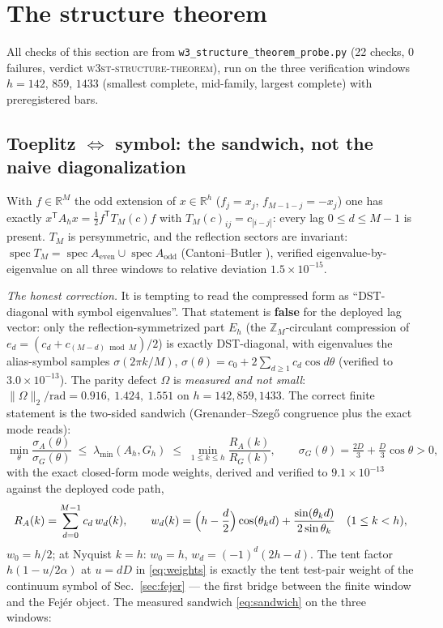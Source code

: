 \documentclass[11pt,a4paper]{article}
\theoremstyle{remark}
\DeclareMathOperator{\spec}{spec}
\begin{document}
\section{The structure theorem}\label{sec:structure}

All checks of this section are from
\texttt{w3\_structure\_theorem\_probe.py} (22 checks, 0 failures,
verdict \textsc{w3st-structure-theorem}), run on the three verification
windows $h=142$, $859$, $1433$ (smallest complete, mid-family, largest
complete) with preregistered bars.

\subsection{Toeplitz $\Leftrightarrow$ symbol: the sandwich, not the
naive diagonalization}

With $f\in\mathbb R^M$ the odd extension of $x\in\mathbb R^h$
($f_j=x_j$, $f_{M-1-j}=-x_j$) one has exactly
$x^{\mathsf T}A_hx=\tfrac12 f^{\mathsf T}T_M(c)f$ with
$T_M(c)_{ij}=c_{|i-j|}$: every lag $0\le d\le M-1$ is present.  $T_M$
is persymmetric, and the reflection sectors are invariant:
$\spec T_M=\spec A_{\mathrm{even}}\cup\spec A_{\mathrm{odd}}$
(Cantoni--Butler \cite{CB76}), verified eigenvalue-by-eigenvalue on all
three windows to relative deviation $1.5\times10^{-15}$.

\emph{The honest correction.}  It is tempting to read the compressed
form as ``DST-diagonal with symbol eigenvalues''.  That statement is
\textbf{false} for the deployed lag vector: only the
reflection-symmetrized part $E_h$ (the $\mathbb Z_M$-circulant
compression of $e_d=(c_d+c_{(M-d)\bmod M})/2$) is exactly DST-diagonal,
with eigenvalues the alias-symbol samples $\sigma(2\pi k/M)$,
$\sigma(\theta)=c_0+2\sum_{d\ge1}c_d\cos d\theta$ (verified to
$3.0\times10^{-13}$).  The parity defect $\Omega$ is \emph{measured and
not small}: $\lVert\Omega\rVert_2/\mathrm{rad}=0.916,\ 1.424,\ 1.551$ on
$h=142,859,1433$.  The correct finite statement is the two-sided
sandwich (Grenander--Szeg\H o congruence \cite{GS58} plus the exact
mode reads):
\begin{equation}\label{eq:sandwich}
\min_\theta\frac{\sigma_A(\theta)}{\sigma_G(\theta)}
\;\le\;\lambda_{\min}(A_h,G_h)\;\le\;
\min_{1\le k\le h}\frac{R_A(k)}{R_G(k)},
\qquad \sigma_G(\theta)=\tfrac{2D}{3}+\tfrac{D}{3}\cos\theta>0 ,
\end{equation}
with the exact closed-form mode weights, derived and verified to
$9.1\times10^{-13}$ against the deployed code path,
\begin{equation}\label{eq:weights}
R_A(k)=\sum_{d=0}^{M-1}c_d\,w_d(k),\qquad
w_d(k)=\Bigl(h-\frac d2\Bigr)\cos(\theta_kd)
+\frac{\sin(\theta_kd)}{2\sin\theta_k}\quad(1\le k<h),
\end{equation}
$w_0=h/2$; at Nyquist $k=h$: $w_0=h$, $w_d=(-1)^d(2h-d)$.  The tent
factor $h(1-u/2\alpha)$ at $u=dD$ in \eqref{eq:weights} is exactly the
tent test-pair weight of the continuum symbol of
Sec.~\ref{sec:fejer} --- the first bridge between the finite window and
the Fej\'er object.  The measured sandwich \eqref{eq:sandwich} on the
three windows:
\end{document}
